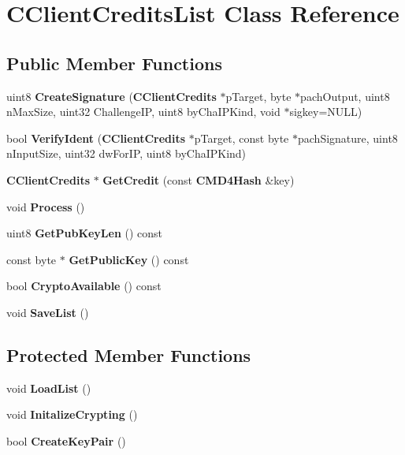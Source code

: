 \section{CClientCreditsList Class Reference}
\label{classCClientCreditsList}
\subsection*{Public Member Functions}
\begin{DoxyCompactItemize}
\item 
uint8 {\bfseries CreateSignature} ({\bf CClientCredits} $\ast$pTarget, byte $\ast$pachOutput, uint8 nMaxSize, uint32 ChallengeIP, uint8 byChaIPKind, void $\ast$sigkey=NULL)\label{classCClientCreditsList_aadf85f0a66e4b0fc2efe202d42ece3d2}

\item 
bool {\bfseries VerifyIdent} ({\bf CClientCredits} $\ast$pTarget, const byte $\ast$pachSignature, uint8 nInputSize, uint32 dwForIP, uint8 byChaIPKind)\label{classCClientCreditsList_a7934386f7490648dac589ab8f7a23e32}

\item 
{\bf CClientCredits} $\ast$ {\bfseries GetCredit} (const {\bf CMD4Hash} \&key)\label{classCClientCreditsList_a0d72f5a70648df80abc8cc094e41cb82}

\item 
void {\bfseries Process} ()\label{classCClientCreditsList_ac786f01487e8f986588ea0ae934dae99}

\item 
uint8 {\bfseries GetPubKeyLen} () const \label{classCClientCreditsList_aec9abac860f50b24efb187ebae143a27}

\item 
const byte $\ast$ {\bfseries GetPublicKey} () const \label{classCClientCreditsList_a6e5549eda61fef9d04ad018e27559718}

\item 
bool {\bfseries CryptoAvailable} () const \label{classCClientCreditsList_a5c6d978afa491182a0053b6caf509d0e}

\item 
void {\bfseries SaveList} ()\label{classCClientCreditsList_a4bddce1c5545e1bba3fd128e62945061}

\end{DoxyCompactItemize}
\subsection*{Protected Member Functions}
\begin{DoxyCompactItemize}
\item 
void {\bfseries LoadList} ()\label{classCClientCreditsList_a64a2c09099ce3c2856e690165e710ef4}

\item 
void {\bfseries InitalizeCrypting} ()\label{classCClientCreditsList_a6084ba1398012b3e4acd750acb9a7eaf}

\item 
bool {\bfseries CreateKeyPair} ()\label{classCClientCreditsList_a49abf1cbd252d0e37239d85474f839cf}

\end{DoxyCompactItemize}
